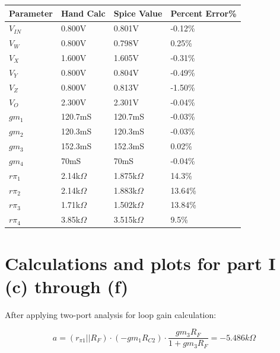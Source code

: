 \documentclass[12pt,a4paper]{article}
\begin{document}
\begin{table}[h]
\centering
\begin{tabular}{|l|l|l|l|}
\hline
Parameter & Hand Calc &  Spice Value & Percent Error\% \\
\hline
$V_{IN}$ & 0.800V &  0.801V &  -0.12\%\\
\hline
$V_{W}$ & 0.800V &  0.798V &  0.25\%\\
\hline
$V_{X}$ & 1.600V &  1.605V &  -0.31\%\\
\hline
$V_{Y}$ & 0.800V &  0.804V &  -0.49\%\\
\hline
$V_{Z}$ & 0.800V &  0.813V &  -1.50\%\\
\hline
$V_{O}$ & 2.300V &  2.301V &  -0.04\%\\
\hline
$gm_{1}$ & 120.7mS & 120.7mS &  -0.03\%\\
\hline
$gm_{2}$ & 120.3mS & 120.3mS &  -0.03\%\\
\hline
$gm_{3}$ & 152.3mS & 152.3mS &  0.02\%\\
\hline
$gm_{4}$ & 70mS & 70mS &  -0.04\%\\
\hline
$r\pi_{1}$ & 2.14k$\Omega$ & 1.875k$\Omega$ &  14.3\%\\
\hline
$r\pi_{2}$ & 2.14k$\Omega$ & 1.883k$\Omega$ &  13.64\%\\
\hline
$r\pi_{3}$ & 1.71k$\Omega$ & 1.502k$\Omega$ &  13.84\%\\
\hline
$r\pi_{4}$ & 3.85k$\Omega$ & 3.515k$\Omega$ &  9.5\%\\
\hline
\end{tabular}
\end{table}




\pagebreak


\section{Calculations and plots for part I (c) through (f)}

After applying two-port analysis for loop gain calculation:

\begin{equation}
  a = (r_{\pi1} || R_{F}) \cdot (-gm_1 R_{C2} ) \cdot \frac{gm_3 R_F}{1 + gm_3 R_F} = -5.486k\Omega
\end{equation}
\end{document}
